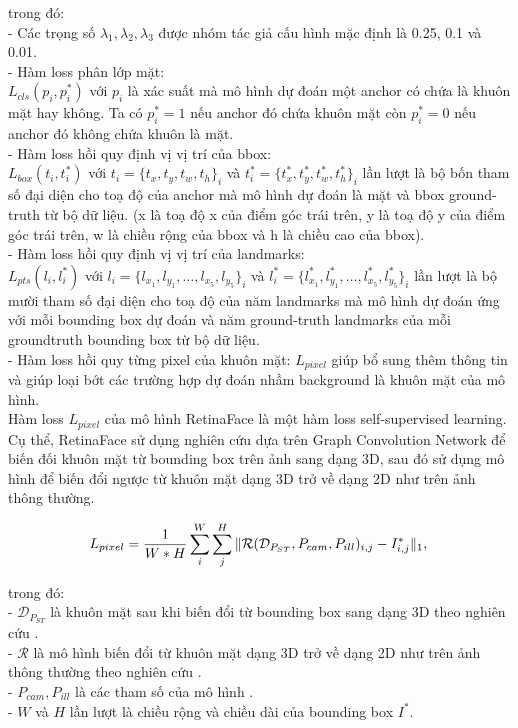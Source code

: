 {    \noindent
    trong đó: \\
    - Các trọng số $\lambda_1, \lambda_2, \lambda_3$ được nhóm tác giả cấu hình mặc định là 0.25, 0.1 và 0.01. \\
    - Hàm loss phân lớp mặt: \\
    $L_{cls}(p_i, p^{*}_i)$ với $p_i$ là xác suất mà mô hình dự đoán một anchor có chứa là khuôn mặt hay không.
    Ta có $p^{*}_i = 1$ nếu anchor đó chứa khuôn mặt còn $p^{*}_i = 0$ nếu anchor đó không chứa khuôn là mặt. \\
    - Hàm loss hồi quy định vị vị trí của bbox: \\
    $L_{box}(t_i, t^{*}_i)$ với $t_i=\{t_x, t_y, t_w, t_h\}_i$ và $t^{*}_i=\{t^{*}_x, t^{*}_y, t^{*}_w, t^{*}_h\}_i$ lần lượt là bộ bốn tham số đại diện cho toạ độ của anchor mà mô hình dự đoán là mặt và bbox ground-truth từ bộ dữ liệu.
    (x là toạ độ x của điểm góc trái trên, y là toạ độ y của điểm góc trái trên, w là chiều rộng của bbox và h là chiều cao của bbox). \\
    - Hàm loss hồi quy định vị vị trí của landmarks: \\
    $L_{pts} (l_i, l^{*}_i)$ với $l_i=\{l_{x_1}, l_{y_1}, \dots , l_{x_5}, l_{y_5}\}_i$ và $l^{*}_i=\{l^{*}_{x_1}, l^{*}_{y_1}, \dots , l^{*}_{x_5}, l^{*}_{y_5}\}_i$ lần lượt là bộ mười tham số đại diện cho toạ độ của năm landmarks mà mô hình dự đoán ứng với mỗi bounding box dự đoán và năm ground-truth landmarks của mỗi groundtruth bounding box từ bộ dữ liệu. \\
    - Hàm loss hồi quy từng pixel của khuôn mặt: $L_{pixel}$ giúp bổ sung thêm thông tin và giúp loại bớt các trường hợp dự đoán nhầm background là khuôn mặt của mô hình. \\
    Hàm loss $L_{pixel}$ của mô hình RetinaFace là một hàm loss self-supervised learning.
    Cụ thể, RetinaFace sử dụng nghiên cứu \cite{zhou2019dense} dựa trên Graph Convolution Network để biến đối khuôn mặt từ bounding box trên ảnh sang dạng 3D, sau đó sử dụng mô hình \cite{genova2018unsupervised} để biến đổi ngược từ khuôn mặt dạng 3D trở về dạng 2D như trên ảnh thông thường.

    \begin{equation}
        L_{pixel}  = \frac{1}{W*H} \sum_{i}^{W} \sum_{j}^{H}  \|\mathcal{R}(\mathcal{D}_{P_{ST}},P_{cam},P_{ill})_{i,j} - I_{i,j}^*\|_1,\\
        \label{fig:retinaface_loss_pixel}
    \end{equation}

    \noindent
    trong đó: \\
    - $\mathcal{D}_{P_{ST}}$ là khuôn mặt sau khi biến đổi từ bounding box sang dạng 3D theo nghiên cứu \cite{zhou2019dense}. \\
    - $\mathcal{R}$ là mô hình biến đổi từ khuôn mặt dạng 3D trở về dạng 2D như trên ảnh thông thường theo nghiên cứu \cite{genova2018unsupervised}. \\
    - $P_{cam}, P_{ill}$ là các tham số của mô hình \cite{genova2018unsupervised}. \\
    - $W$ và $H$ lần lượt là chiều rộng và chiều dài của bounding box $I^*$.

}
